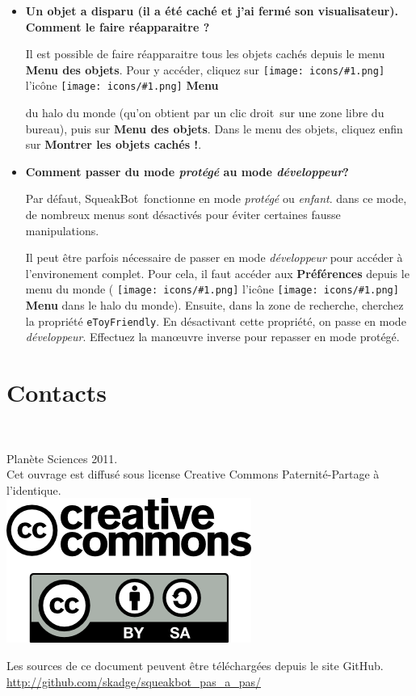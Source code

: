 \documentclass[a4paper,12pt]{book}
\def\appName{SqueakBot}
\def\cd{clic droit~}
\newcommand{\code}[1]{\texttt{#1}}
\newcommand{\important}[1]{\textbf{#1}}
\newcommand{\inserticon}[1]
{
\texttt{[image: icons/\#1.png]}
}
\newcommand{\icon}[2][]
{
\ifthenelse {\equal{#1} {}} {\inserticon{#2}} {l'icône \inserticon{#2} \important{#1}}
}
\begin{document}
\begin{itemize}
	\item {\bf Un objet a disparu (il a été caché et j'ai fermé son
	visualisateur). Comment le faire réapparaitre ?}

	Il est possible de faire réapparaitre tous les objets cachés depuis le menu
	\important{Menu des objets}. Pour y accéder, cliquez sur \icon[Menu]{menu}
	du halo du monde (qu'on obtient par un \cd sur une zone libre du bureau),
	puis sur \important{Menu des objets}. Dans le menu des objets, cliquez
	enfin sur \important{Montrer les objets cachés !}.

    \item {\bf Comment passer du mode \emph{protégé} au mode \emph{développeur}?}

	Par défaut, \appName~fonctionne en mode \emph{protégé} ou \emph{enfant}. dans
	ce mode, de nombreux menus sont désactivés pour éviter certaines fausse
	manipulations.
	
	Il peut être parfois nécessaire de passer en mode \emph{développeur} pour
	accéder à l'environement complet. Pour cela, il faut accéder aux
	\important{Préférences} depuis le menu du monde (\icon[Menu]{menu} dans le
	halo du monde). Ensuite, dans la zone de recherche, cherchez la propriété
	\code{eToyFriendly}. En désactivant cette propriété, on passe en mode \emph{
	développeur}. Effectuez la man\oe uvre inverse pour repasser en mode
	protégé.  
	
	\end{itemize}

\section{Contacts}

\printglossaries

\clearpage
\thispagestyle{empty}
~
\vfill
\begin{center}
	Planète Sciences 2011.\\
	Cet ouvrage est diffusé sous license Creative Commons Paternité-Partage à l'identique.\\
	\vspace{2cm}
	\includegraphics[scale=0.5]{logo_cc.png}
\end{center}

\vfill

\begin{center}
	Les sources de ce document peuvent être téléchargées depuis le site GitHub.
	\url{http://github.com/skadge/squeakbot_pas_a_pas/}
\end{center}

\vfill
\end{document}
